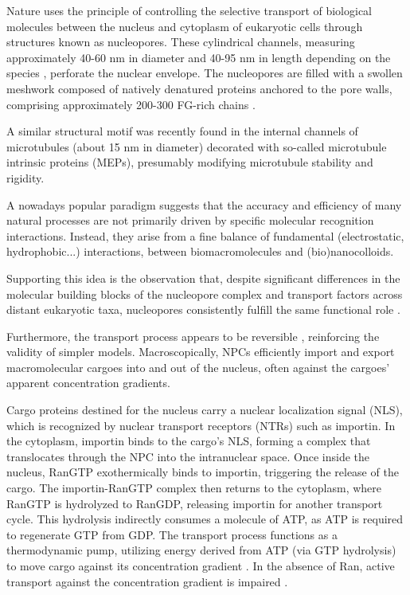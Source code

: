 \documentclass[12pt, a4paper]{article}
\begin{document}
Nature uses the principle of controlling the selective transport of biological molecules between the nucleus and cytoplasm of eukaryotic cells through structures known as nucleopores.
These cylindrical channels, measuring approximately 40-60 nm in diameter and 40-95 nm in length depending on the species \cite{Yang1998, Beck2004, VonAppen2015, Alberts2015, Hayama2017, Holzer2018}, perforate the nuclear envelope.
The nucleopores are filled with a swollen meshwork composed of natively denatured proteins anchored to the pore walls, comprising approximately 200-300 FG-rich chains \cite{Holzer2018, Ori2013, Rout2000, Dickmanns2015}.

A similar structural motif was recently found in the internal channels of microtubules (about 15 nm in diameter) 
decorated with so-called microtubule intrinsic proteins (MEPs), presumably modifying microtubule stability and rigidity.%



A nowadays popular paradigm suggests that the accuracy and efficiency of many natural processes are not primarily driven by specific molecular recognition interactions.
Instead, they arise from a fine balance of fundamental  (electrostatic, hydrophobic...) interactions, between biomacromolecules and (bio)nanocolloids.

Supporting this idea is the observation that, despite significant differences in the molecular building blocks of the nucleopore complex and transport factors across distant eukaryotic taxa, nucleopores consistently fulfill the same functional role \cite{DeGrasse2009, Maimon2012, Ori2013, Hayama2017, Yaron2018, Holzer2018}. 

Furthermore, the transport process appears to be reversible \cite{Nachury1999, Sakiyama2016},
reinforcing the validity of simpler models.
Macroscopically, NPCs efficiently import and export macromolecular cargoes into and out of the nucleus, often against the cargoes' apparent concentration gradients.


Cargo proteins destined for the nucleus carry a nuclear localization signal (NLS), which is recognized by nuclear transport receptors (NTRs) such as importin. In the cytoplasm, importin binds to the cargo's NLS, forming a complex that translocates through the NPC into the intranuclear space. Once inside the nucleus, RanGTP exothermically binds to importin, triggering the release of the cargo. The importin-RanGTP complex then returns to the cytoplasm, where RanGTP is hydrolyzed to RanGDP, releasing importin for another transport cycle. This hydrolysis indirectly consumes a molecule of ATP, as ATP is required to regenerate GTP from GDP. The transport process functions as a thermodynamic pump, utilizing energy derived from ATP (via GTP hydrolysis) to move cargo against its concentration gradient \cite{Rout2003, Tijana2017}. In the absence of Ran, active transport against the concentration gradient is impaired \cite{Lowe2015, Yang2004}.
\end{document}
